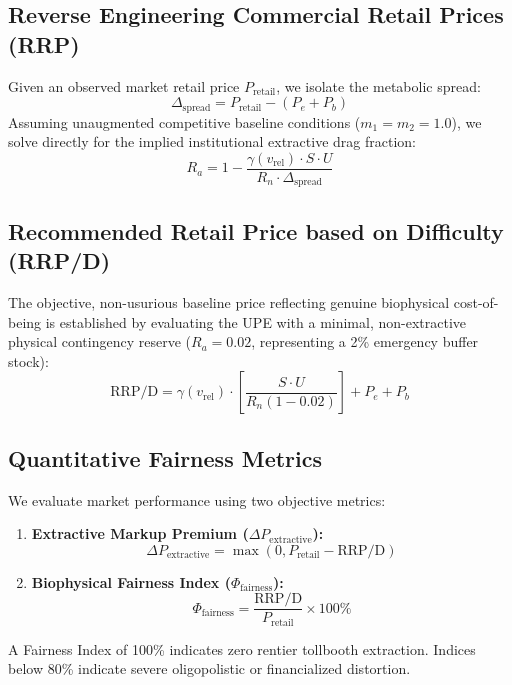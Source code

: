 \documentclass[preprint,12pt,authoryear]{elsarticle}
\begin{document}
\subsection{Reverse Engineering Commercial Retail Prices (RRP)}
Given an observed market retail price $P_{\text{retail}}$, we isolate the metabolic spread:
\begin{equation}
\Delta_{\text{spread}} = P_{\text{retail}} - (P_e + P_b)
\end{equation}
Assuming unaugmented competitive baseline conditions ($m_1 = m_2 = 1.0$), we solve directly for the implied institutional extractive drag fraction:
\begin{equation}
R_a = 1 - \frac{\gamma(v_{\text{rel}}) \cdot S \cdot U}{R_n \cdot \Delta_{\text{spread}}}
\label{eq:reverse_ra}
\end{equation}

\subsection{Recommended Retail Price based on Difficulty (RRP/D)}
The objective, non-usurious baseline price reflecting genuine biophysical cost-of-being is established by evaluating the UPE with a minimal, non-extractive physical contingency reserve ($R_a = 0.02$, representing a 2\% emergency buffer stock):
\begin{equation}
\text{RRP/D} = \gamma(v_{\text{rel}}) \cdot \left[ \frac{S \cdot U}{R_n (1 - 0.02)} \right] + P_e + P_b
\label{eq:rrpd}
\end{equation}

\subsection{Quantitative Fairness Metrics}
We evaluate market performance using two objective metrics:
\begin{enumerate}
    \item \textbf{Extractive Markup Premium ($\Delta P_{\text{extractive}}$):}
    \begin{equation}
    \Delta P_{\text{extractive}} = \max(0, P_{\text{retail}} - \text{RRP/D})
    \end{equation}
    \item \textbf{Biophysical Fairness Index ($\Phi_{\text{fairness}}$):}
    \begin{equation}
    \Phi_{\text{fairness}} = \frac{\text{RRP/D}}{P_{\text{retail}}} \times 100\%
    \end{equation}
\end{enumerate}
A Fairness Index of 100\% indicates zero rentier tollbooth extraction. Indices below 80\% indicate severe oligopolistic or financialized distortion.
\end{document}
